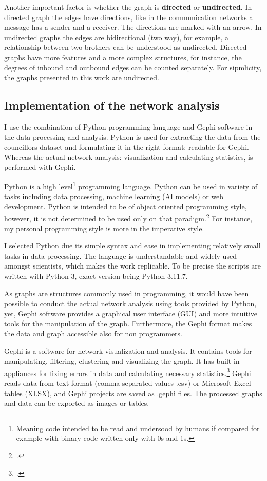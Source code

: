 Another important factor is whether the graph is \textbf{directed} or \textbf{undirected}. In directed graph the edges have directions, like in the communication networks a message has a sender and a receiver. The directions are marked with an arrow. In undirected graphs the edges are bidirectional (two way), for example, a relationship between two brothers can be understood as undirected. Directed graphs have more features and a more complex structures, for instance, the degrees of inbound and outbound edges can be counted separately. For sipmlicity, the graphs presented in this work are undirected.

\subsection{Implementation of the network analysis}
I use the combination of Python programming language and Gephi software in the data processing and analysis. Python is used for extracting the data from the councillors-dataset and formulating it in the right format: readable for Gephi. Whereas the actual network analysis: visualization and calculating statistics, is performed with Gephi. 

Python is a high level\footnote{Meaning code intended to be read and undersood by humans if compared for example with binary code written only with 0s and 1s.} programming language. Python can be used in variety of tasks including data processing, machine learning (AI models) or web development. Python is intended to be of object oriented programming style, however, it is not determined to be used only on that paradigm.\footcite[p. 1.]{pythonbook} For instance, my personal programming style is more in the imperative style. 

I selected Python due its simple syntax and ease in implementing relatively small tasks in data processing. The language is understandable and widely used amongst scientists, which makes the work replicable. To be precise the scripts are written with Python 3, exact version being Python 3.11.7.

As graphs are structures commonly used in programming, it would have been possible to conduct the actual network analysis using tools provided by Python, yet, Gephi software provides a graphical user interface (GUI) and more intuitive tools for the manipulation of the graph. Furthermore, the Gephi format makes the data and graph accessible also for non programmers.

Gephi is a software for network visualization and analysis. It contains tools for manipulating, filtering, clustering and visualizing the graph. It has built in appliances for fixing errors in data and calculating necessary statistics.\footcite{gephi} Gephi reads data from text format (comma separated values .csv) or Microsoft Excel tables (XLSX), and Gephi projects are saved as .gephi files. The processed graphs and data can be exported as images or tables.  

